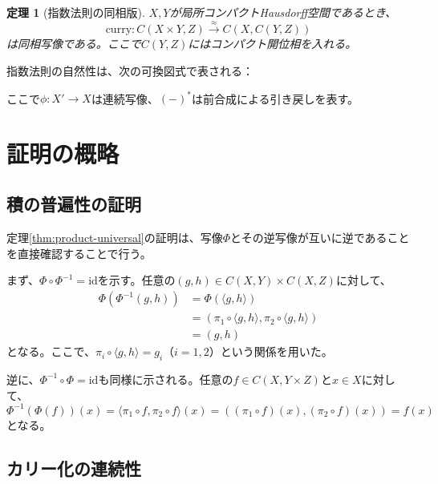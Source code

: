 \documentclass[uplatex, a4paper]{jlreq}
\newtheorem{theorem}{定理}[section]
\newcommand{\id}{\mathrm{id}}
\newcommand{\comp}{\circ}
\newcommand{\curry}{\mathrm{curry}}
\begin{document}
\begin{theorem}[指数法則の同相版]
\label{thm:exponential-homeo}
$X, Y$が局所コンパクトHausdorff空間であるとき、
\[
\curry: C(X \times Y, Z) \xrightarrow{\approx} C(X, C(Y, Z))
\]
は同相写像である。ここで$C(Y, Z)$にはコンパクト開位相を入れる。
\end{theorem}

指数法則の自然性は、次の可換図式で表される：

\begin{center}
\end{center}

ここで$\phi: X' \to X$は連続写像、$(-)^*$は前合成による引き戻しを表す。

\section{証明の概略}

\subsection{積の普遍性の証明}

定理\ref{thm:product-universal}の証明は、写像$\Phi$とその逆写像が互いに逆であることを直接確認することで行う。

まず、$\Phi \comp \Phi^{-1} = \id$を示す。任意の$(g, h) \in C(X, Y) \times C(X, Z)$に対して、
\begin{align}
\Phi(\Phi^{-1}(g, h)) &= \Phi(\langle g, h \rangle) \\
&= (\pi_1 \comp \langle g, h \rangle, \pi_2 \comp \langle g, h \rangle) \\
&= (g, h)
\end{align}
となる。ここで、$\pi_i \comp \langle g, h \rangle = g_i$（$i = 1, 2$）という関係を用いた。

逆に、$\Phi^{-1} \comp \Phi = \id$も同様に示される。任意の$f \in C(X, Y \times Z)$と$x \in X$に対して、
\[
\Phi^{-1}(\Phi(f))(x) = \langle \pi_1 \comp f, \pi_2 \comp f \rangle(x) = ((\pi_1 \comp f)(x), (\pi_2 \comp f)(x)) = f(x)
\]
となる。

\subsection{カリー化の連続性}
\end{document}
